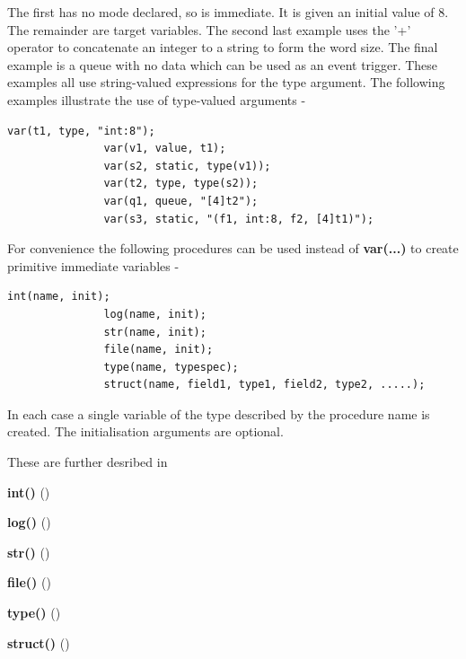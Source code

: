             The first has no mode declared, so is immediate. It is given an
            initial value of 8. The remainder are target variables. The
            second last example uses the '+' operator to concatenate an
            integer to a string to form the word size. The final example is a
            queue with no data which can be used as an event trigger.
            These examples all use string-valued expressions for the
            type argument. The following examples illustrate the use of
            type-valued arguments -
            \begin{lstlisting}[gobble=12, language=threepl]
               var(t1, type, "int:8");
               var(v1, value, t1);
               var(s2, static, type(v1));
               var(t2, type, type(s2));
               var(q1, queue, "[4]t2");
               var(s3, static, "(f1, int:8, f2, [4]t1)");
            \end{lstlisting}

            For convenience the following procedures can be used instead of
            {\bf var(...)} to create primitive immediate variables -
            \begin{lstlisting}[gobble=12, language=threepl]
               int(name, init);
               log(name, init);
               str(name, init);
               file(name, init);
               type(name, typespec);
               struct(name, field1, type1, field2, type2, .....);
            \end{lstlisting}
            In each case a single variable of the type described by the
            procedure name is created. The initialisation arguments are optional.

            These are further desribed in 
            \blist
            \item   {\bf int()} ()
            \item   {\bf log()} ()
            \item   {\bf str()} ()
            \item   {\bf file()} ()
            \item   {\bf type()} ()
            \item   {\bf struct()} ()
            \blend

